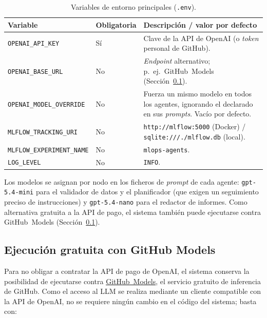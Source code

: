 \documentclass[12pt,a4paper]{article}
\theoremstyle{plain}
\begin{document}
\begin{table}[H]
\centering
\footnotesize
\setlength{\tabcolsep}{4pt}
\renewcommand{\arraystretch}{1.15}
\begin{tabularx}{\linewidth}{>{\RaggedRight\arraybackslash}p{4.0cm} >{\RaggedRight\arraybackslash}p{1.8cm} >{\RaggedRight\arraybackslash}X}
\hline
\textbf{Variable} & \textbf{Obligatoria} & \textbf{Descripción / valor por defecto} \\\hline
\texttt{OPENAI\_API\_KEY} & Sí & Clave de la API de OpenAI (o \textit{token} personal de GitHub). \\\hline
\texttt{OPENAI\_BASE\_URL} & No & \textit{Endpoint} alternativo; p.~ej.\ GitHub~Models (Sección~\ref{anexo:repro-github}). \\\hline
\texttt{OPENAI\_MODEL\_OVERRIDE} & No & Fuerza un mismo modelo en todos los agentes, ignorando el declarado en sus \textit{prompts}. Vacío por defecto. \\\hline
\texttt{MLFLOW\_TRACKING\_URI} & No & \texttt{http://mlflow:5000} (Docker) / \texttt{sqlite:///./mlflow.db} (local). \\\hline
\texttt{MLFLOW\_EXPERIMENT\_NAME} & No & \texttt{mlops-agents}. \\\hline
\texttt{LOG\_LEVEL} & No & \texttt{INFO}. \\\hline
\end{tabularx}
\caption{Variables de entorno principales (\texttt{.env}).}
\label{tab:repro-env}
\end{table}

\noindent
Los modelos se asignan por nodo en los ficheros de \textit{prompt} de cada agente:
\texttt{gpt-5.4-mini} para el validador de datos y el planificador (que exigen un
seguimiento preciso de instrucciones) y \texttt{gpt-5.4-nano} para el redactor de
informes. Como alternativa gratuita a la API de pago, el sistema también puede
ejecutarse contra GitHub~Models (Sección~\ref{anexo:repro-github}).

\subsection{Ejecución gratuita con GitHub Models}
\label{anexo:repro-github}

Para no obligar a contratar la API de pago de OpenAI, el sistema conserva la posibilidad
de ejecutarse contra \href{https://github.com/marketplace/models}{GitHub~Models}, el
servicio gratuito de inferencia de GitHub. Como el acceso al LLM se realiza mediante un
cliente compatible con la API de OpenAI, no se requiere ningún cambio en el código del
sistema; basta con:
\end{document}
